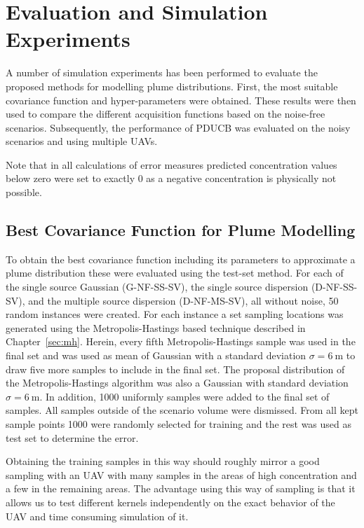 \chapter{Evaluation and Simulation Experiments}\label{sec:exp}
A number of simulation experiments has been performed to evaluate the proposed 
methods for modelling plume distributions. First, the most suitable covariance 
function and hyper-parameters were obtained. These results were then used to 
compare the different acquisition functions based on the noise-free scenarios.  
Subsequently, the performance of PDUCB was evaluated on the noisy scenarios and 
using multiple UAVs.

Note that in all calculations of error measures predicted concentration values 
below zero were set to exactly 0 as a negative concentration is physically not 
possible.

\section{Best Covariance Function for Plume Modelling}\label{sec:bestkernel}
To obtain the best covariance function including its parameters to approximate 
a plume distribution these were evaluated using the test-set method. For each of 
the single source Gaussian (G-NF-SS-SV), the single source dispersion 
(D-NF-SS-SV), and the multiple source dispersion (D-NF-MS-SV), all without 
noise, 50 random instances were created. For each instance a set sampling 
locations was generated using the Metropolis-Hastings based technique described 
in Chapter~\ref{sec:mh}. Herein, every fifth Metropolis-Hastings sample was used 
in the final set and was used as mean of Gaussian with a standard deviation 
$\sigma = \SI{6}{\meter}$ to draw five more samples to include in the final set.  
The proposal distribution of the Metropolis-Hastings algorithm was also 
a Gaussian with standard deviation $\sigma = \SI{6}{\meter}$. In addition, 1000 
uniformly samples were added to the final set of samples. All samples outside of 
the scenario volume were dismissed. From all kept sample points 1000 were 
randomly selected for training and the rest was used as test set to determine 
the error.

Obtaining the training samples in this way should roughly mirror a good sampling 
with an UAV with many samples in the areas of high concentration and a few in 
the remaining areas. The advantage using this way of sampling is that it allows 
us to test different kernels independently on the exact behavior of the UAV and 
time consuming simulation of it.

